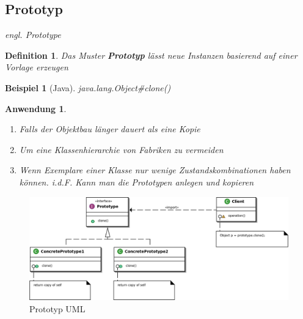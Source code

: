 \documentclass[a4paper]{article}
\theoremstyle{break}
\newtheorem{defi}{Definition}[section]
\newtheorem{ex}{Beispiel}[section]
\newtheorem{why}{Anwendung}[section]
\begin{document}
\subsection{Prototyp}
\textit{engl. Prototype}
\begin{defi}
	Das Muster \textbf{Prototyp} lässt neue Instanzen basierend auf einer Vorlage erzeugen
\end{defi}
\begin{ex}[Java]
	java.lang.Object\#clone()
\end{ex}
\begin{why}
	\begin{enumerate}
		\item Falls der Objektbau länger dauert als eine Kopie
		\item Um eine Klassenhierarchie von Fabriken zu vermeiden
		\item Wenn Exemplare einer Klasse nur wenige Zustandskombinationen haben können. i.d.F. Kann man die Prototypen anlegen und kopieren
	\end{enumerate}
\end{why}
\begin{figure}[H]
	\centering
	\includegraphics[width=\textwidth]{../diagrams/uml/PrototypePattern.png}
	\caption{Prototyp UML}
\end{figure}

\newpage
\end{document}
